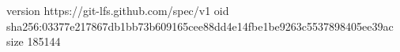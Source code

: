 version https://git-lfs.github.com/spec/v1
oid sha256:03377e217867db1bb73b609165cee88dd4e14fbe1be9263c5537898405ee39ac
size 185144

